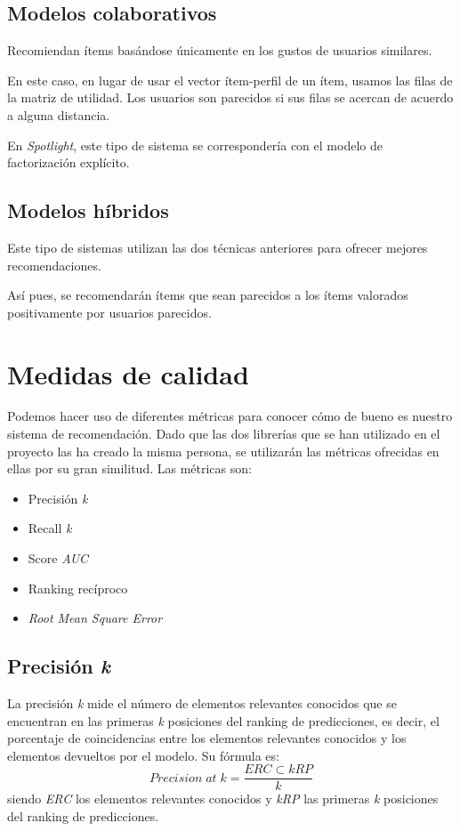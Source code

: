 \subsection{Modelos colaborativos}\label{collaborative-filtering}
Recomiendan ítems basándose únicamente en los gustos de usuarios similares.

En este caso, en lugar de usar el vector ítem-perfil de un ítem, usamos las filas de la matriz de utilidad. Los usuarios son parecidos si sus filas se acercan de acuerdo a alguna distancia.

En \textit{Spotlight}, este tipo de sistema se correspondería con el modelo de factorización explícito.

\subsection{Modelos híbridos}\label{modelos-hibridos}
Este tipo de sistemas utilizan las dos técnicas anteriores para ofrecer mejores recomendaciones.

Así pues, se recomendarán ítems que sean parecidos a los ítems valorados positivamente por usuarios parecidos.

\section{Medidas de calidad}\label{medidas-de-calidad}
Podemos hacer uso de diferentes métricas para conocer cómo de bueno es nuestro sistema de recomendación. Dado que las dos librerías que se han utilizado en el proyecto las ha creado la misma persona, se utilizarán las métricas ofrecidas en ellas por su gran similitud. Las métricas son:
\begin{itemize}
\tightlist
\item Precisión \textit{k}
\item Recall \textit{k}
\item Score \textit{AUC}
\item Ranking recíproco
\item \textit{Root Mean Square Error}
\end{itemize}

\subsection{Precisión \textit{k}}\label{precision-k}
La precisión \textit{k} \cite{precision_at_k} mide el número de elementos relevantes conocidos que se encuentran en las primeras \textit{k} posiciones del ranking de predicciones, es decir, el porcentaje de coincidencias entre los elementos relevantes conocidos y los elementos devueltos por el modelo. Su fórmula es:
\begin{equation}
Precision\;at\;k = \frac{ERC \subset kRP}{k}
\end{equation}
siendo \textit{ERC} los elementos relevantes conocidos y \textit{kRP} las primeras \textit{k} posiciones del ranking de predicciones.

